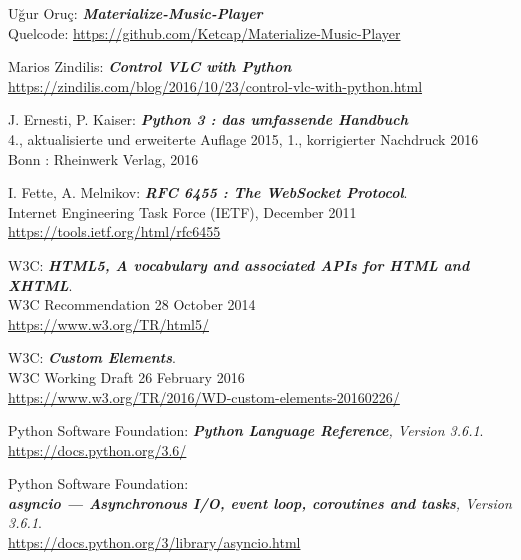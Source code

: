 \documentclass[12pt,a4paper,hidelinks]{scrreprt}
\begin{document}
\begin{thebibliography}{99}

	Uğur Oruç: \textbf{\textit{Materialize-Music-Player}} \\
	Quelcode: \url{https://github.com/Ketcap/Materialize-Music-Player}

	Marios Zindilis: \textbf{\textit{Control VLC with Python}}
	\\\url{https://zindilis.com/blog/2016/10/23/control-vlc-with-python.html}
	
	J. Ernesti, P. Kaiser: \textit{\textbf{Python 3 : das umfassende Handbuch}}
	\\4., aktualisierte und erweiterte Auflage 2015, 1., korrigierter Nachdruck 2016
	\\Bonn : Rheinwerk Verlag, 2016

	I. Fette, A. Melnikov: \textbf{\textsl{RFC 6455 : The WebSocket Protocol}}.
	\\Internet Engineering Task Force (IETF), December 2011 %
	\\\url{https://tools.ietf.org/html/rfc6455}

	W3C: \textit{\textbf{HTML5, A vocabulary and associated APIs for HTML and XHTML}}.
	\\W3C Recommendation 28 October 2014
	\\\url{https://www.w3.org/TR/html5/}

	W3C: \textit{\textbf{Custom Elements}}.
	\\W3C Working Draft 26 February 2016
	\\\url{https://www.w3.org/TR/2016/WD-custom-elements-20160226/}

	Python Software Foundation: \textit{\textbf{Python Language Reference}, Version 3.6.1}.
	\\\url{https://docs.python.org/3.6/}

	Python Software Foundation:
	\\\textit{\textbf{asyncio — Asynchronous I/O, event loop, coroutines and tasks}, Version 3.6.1}.
	\\\url{	https://docs.python.org/3/library/asyncio.html}


\end{thebibliography}
\end{document}
